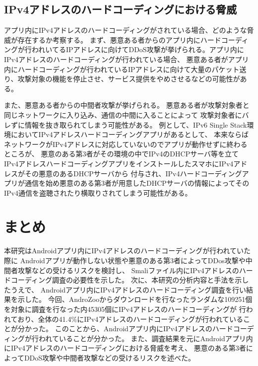 \documentclass[a4j]{jarticle}
\begin{document}
\subsection{IPv4アドレスのハードコーディングにおける脅威}
アプリ内にIPv4アドレスのハードコーディングがされている場合、どのような脅威が存在するか考察する。
まず、悪意ある者からのアプリ内にハードコーディングが行われいてるIPアドレスに向けてDDoS攻撃が挙げられる。アプリ内にIPv4アドレスのハードコーディングが行われている場合、
悪意ある者がアプリ内にハードコーディングが行われているIPアドレスに向けて大量のパケット送り、攻撃対象の機能を停止させ、サービス提供をやめさせるなどの可能性がある。

また、悪意ある者からの中間者攻撃が挙げられる。
悪意ある者が攻撃対象者と同じネットワークに入り込み、通信の中間に入ることによって
攻撃対象者にバレずに情報を抜き取られてしまう可能性がある。
例として、IPv6 Single Stack環境においてIPv4アドレスハードコーディングアプリがあるとして、
本来ならばネットワークがIPv4アドレスに対応していないのでアプリが動作せずに終わるところが、
悪意のある第3者がその環境の中でIPv4のDHCPサーバ等を立て
IPv4アドレスハードコーディングアプリをインストールしたスマホにIPv4アドレスがその悪意のあるDHCPサーバから
付与され、IPv4ハードコーディングアプリが通信を始め悪意のある第3者が用意したDHCPサーバの情報によってそのIPv4通信を盗聴されたり横取りされてしまう可能性がある。

\newpage
\section{まとめ}
本研究はAndroidアプリ内にIPv4アドレスのハードコーディングが行われていた際に
Androidアプリが動作しない状態や悪意のある第3者によってDDos攻撃や中間者攻撃などの受けるリスクを検討し、
Smaliファイル内にIPv4アドレスのハードコーディング調査の必要性を示した。
次に、本研究の分析内容と手法を示したうえで、
Androidアプリ内にIPv4アドレスのハードコーディング調査を行い結果を示した。
今回、AndroZooからダウンロードを行なったランダムな109251個を対象に調査を行なった内45305個にIPv4アドレスのハードコーディングが
行われており、全体の41.4\%にIPv4アドレスのハードコーディングが行われていることが分かった。
このことから、Androidアプリ内にIPv4アドレスのハードコーディングが行われていることが分かった。
また、調査結果を元にAndroidアプリ内にIPv4アドレスのハードコーディングにおける脅威を考え、
悪意のある第3者によってDDoS攻撃や中間者攻撃などの受けるリスクを述べた。
\end{document}
